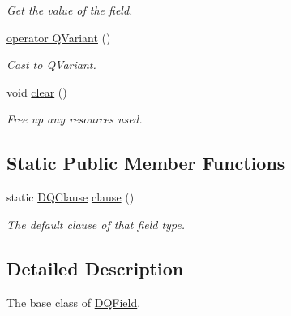 \begin{DoxyCompactItemize}
\begin{DoxyCompactList}\small\item\em Get the value of the field. \item\end{DoxyCompactList}\item 
\hypertarget{classDQBaseField_a6cb1f4cb9501b27818453ec37570580f}{
\hyperlink{classDQBaseField_a6cb1f4cb9501b27818453ec37570580f}{operator QVariant} ()}
\label{classDQBaseField_a6cb1f4cb9501b27818453ec37570580f}

\begin{DoxyCompactList}\small\item\em Cast to QVariant. \item\end{DoxyCompactList}\item 
\hypertarget{classDQBaseField_a0c9970518c790bb356007470f0a6b8c1}{
void \hyperlink{classDQBaseField_a0c9970518c790bb356007470f0a6b8c1}{clear} ()}
\label{classDQBaseField_a0c9970518c790bb356007470f0a6b8c1}

\begin{DoxyCompactList}\small\item\em Free up any resources used. \item\end{DoxyCompactList}\end{DoxyCompactItemize}
\subsection*{Static Public Member Functions}
\begin{DoxyCompactItemize}
\item 
\hypertarget{classDQBaseField_a4cc6673744e8e43b55bf02854f08fa39}{
static \hyperlink{classDQClause}{DQClause} \hyperlink{classDQBaseField_a4cc6673744e8e43b55bf02854f08fa39}{clause} ()}
\label{classDQBaseField_a4cc6673744e8e43b55bf02854f08fa39}

\begin{DoxyCompactList}\small\item\em The default clause of that field type. \item\end{DoxyCompactList}\end{DoxyCompactItemize}


\subsection{Detailed Description}
The base class of \hyperlink{classDQField}{DQField}. 

